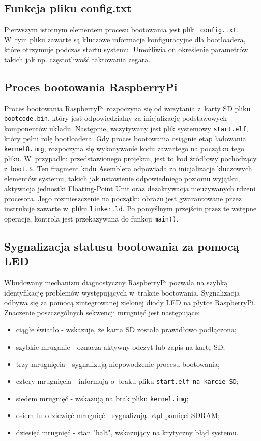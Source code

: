 \documentclass[shortabstract]{iithesis}
\begin{document}
\subsection{Funkcja pliku config.txt}
Pierwszym istotnym elementem procesu bootowania jest plik \texttt{ config.txt}. W~tym pliku zawarte są kluczowe informacje konfiguracyjne dla bootloadera, które otrzymuje podczas startu systemu. Umożliwia on określenie parametrów takich jak np. częstotliwość taktowania zegara. 
\subsection{Proces bootowania RaspberryPi}
Proces bootowania RaspberryPi rozpoczyna się od wczytania z~karty SD pliku \texttt{bootcode.bin}, który jest odpowiedzialny za inicjalizację podstawowych komponentów układu. Następnie, wczytywany jest plik systemowy \texttt{start.elf}, który pełni rolę bootloadera. Gdy proces bootowania osiągnie etap ładowania \texttt{kernel8.img}, rozpoczyna się wykonywanie kodu zawartego na początku tego pliku. W~przypadku przedstawionego projektu, jest to kod źródłowy pochodzący z~\texttt{boot.S}. Ten fragment kodu Asemblera odpowiada za inicjalizację kluczowych elementów systemu, takich jak ustawienie odpowiedniego poziomu wyjątku, aktywacja jednostki Floating-Point Unit oraz dezaktywacja nieużywanych rdzeni procesora. Jego rozmieszczenie na początku obrazu jest gwarantowane przez instrukcje zawarte w~pliku \texttt{linker.ld}. Po pomyślnym przejściu przez te wstępne operacje, kontrola jest przekazywana do funkcji \texttt{main()}.
\subsection{Sygnalizacja statusu bootowania za pomocą LED}
Wbudowany mechanizm diagnostyczny RaspberryPi pozwala na szybką identyfikację problemów występujących w~trakcie bootowania. Sygnalizacja odbywa się za pomocą zintegrowanej zielonej diody LED na płytce RaspberryPi. Znaczenie poszczególnych sekwencji mrugnięć jest następujące:
\begin{itemize}
 \item ciągłe światło - wskazuje, że karta SD została prawidłowo podłączona;
 \item szybkie mruganie - oznacza aktywny odczyt lub zapis na kartę SD;
 \item trzy mrugnięcia - sygnalizują niepowodzenie procesu bootowania;
 \item cztery mrugnięcia - informują o~braku pliku \texttt{start.elf na karcie SD};
 \item siedem mrugnięć - wskazują na brak pliku \texttt{kernel.img};
 \item osiem lub dziewięć mrugnięć - sygnalizują błąd pamięci SDRAM;
 \item dziesięć mrugnięć - stan "halt", wskazujący na krytyczny błąd systemu.
\end{itemize}
\end{document}
